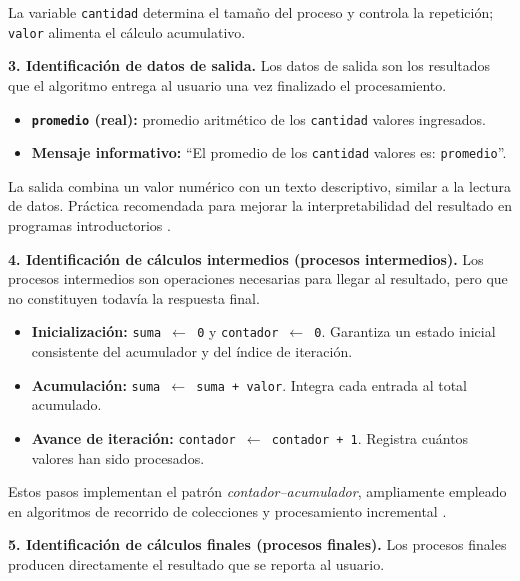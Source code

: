 \documentclass[12pt,twoside]{book}
\begin{document}
					\noindent
					La variable \texttt{cantidad} determina el tamaño del proceso y controla la repetición; \texttt{valor} alimenta el cálculo acumulativo.
					
					\noindent
					\textbf{3. Identificación de datos de salida.}
					Los datos de salida son los resultados que el algoritmo entrega al usuario una vez finalizado el procesamiento.
					
					\begin{itemize}
						\item \textbf{\texttt{promedio} (real):} promedio aritmético de los \texttt{cantidad} valores ingresados.
						\item \textbf{Mensaje informativo:} ``El promedio de los \texttt{cantidad} valores es: \texttt{promedio}''.
					\end{itemize}
					
					\noindent
					La salida combina un valor numérico con un texto descriptivo, similar a la lectura de datos. Práctica recomendada para mejorar la interpretabilidad del resultado en programas introductorios \cite{Gaddis2022Starting,Farrell2018Programming}.
					
					\noindent
					\textbf{4. Identificación de cálculos intermedios (procesos intermedios).}
					Los procesos intermedios son operaciones necesarias para llegar al resultado, pero que no constituyen todavía la respuesta final.
					
					\begin{itemize}
						\item \textbf{Inicialización:} \texttt{suma $\leftarrow$ 0} y \texttt{contador $\leftarrow$ 0}. Garantiza un estado inicial consistente del acumulador y del índice de iteración.
						\item \textbf{Acumulación:} \texttt{suma $\leftarrow$ suma + valor}. Integra cada entrada al total acumulado.
						\item \textbf{Avance de iteración:} \texttt{contador $\leftarrow$ contador + 1}. Registra cuántos valores han sido procesados.
					\end{itemize}
					
					\noindent
					Estos pasos implementan el patrón \emph{contador--acumulador}, ampliamente empleado en algoritmos de recorrido de colecciones y procesamiento incremental \cite{Joyanes2007Fundamentos,Gaddis2022Starting}.
					
					\noindent
					\textbf{5. Identificación de cálculos finales (procesos finales).}
					Los procesos finales producen directamente el resultado que se reporta al usuario.
					
\end{document}
